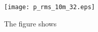 \begin{figure}[H]
	\centering
	\texttt{[image: p\_rms\_10m\_32.eps]}
	\caption{The figure shows}
		\label{fig:p_rms_10m_32}
\end{figure}